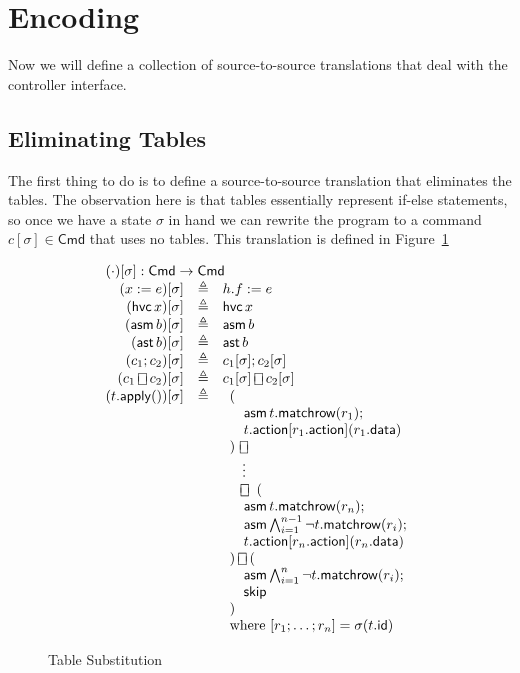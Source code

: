 \documentclass{article}
\newcommand{\Cmd}{\mathsf{Cmd}}
\newcommand{\action}{\mathsf{action}}
\newcommand{\data}{\mathsf{data}}
\newcommand{\id}{\mathsf{id}}
\newcommand{\assert}{\mathop{\mathsf{ast}}}
\newcommand{\assume}{\mathop{\mathsf{asm}}}
\newcommand{\apply}{\mathsf{apply}}
\newcommand{\choiceop}{\rotatebox[origin=c]{90}{$\sqsubset\!\!\!\sqsupset$}}
\newcommand{\choice}{\mathbin{\choiceop}}
\newcommand{\havoc}[1]{\mathop{\mathsf{hvc}}#1}
\newcommand{\SKIP}{\mathsf{skip}}
\newcommand{\matchrow}{\mathsf{matchrow}}
\begin{document}
\section{Encoding}

Now we will define a collection of source-to-source translations that deal with
the controller interface.

\subsection{Eliminating Tables}

The first thing to do is to define a source-to-source translation that
eliminates the tables. The observation here is that tables essentially represent
if-else statements, so once we have a state $\sigma$ in hand we can rewrite the
program to a command $c[\sigma] \in \Cmd$ that uses no tables. This translation
is defined in Figure~\ref{fig:table-elim}

\begin{figure}
  \[\begin{array}{r>{\triangleq}cl}
  \multicolumn{3}{l}{(\cdot)[\sigma] : \Cmd \to \Cmd} \\
  (x := e)[\sigma] && h.f := e \\
  (\havoc x)[\sigma] && \havoc x \\
  (\assume b)[\sigma] && \assume b \\
  (\assert b)[\sigma] && \assert b \\
  (c_1;c_2)[\sigma] && c_1[\sigma];c_2[\sigma] \\
  (c_1 \choice c_2)[\sigma] && c_1[\sigma] \choice c_2[\sigma] \\
  (t.\apply())[\sigma] &&
  \begin{array}[t]{l}
    (\\
    \quad \assume {t.\matchrow(r_1)};\\
    \quad t.\action[r_1.\action](r_1.\data)\\
    )~\choice\\
    \phantom)~\,\vdots\\
    \phantom)\,\choice~(\\
    \quad \assume {t.\matchrow(r_n)};\\
    \quad \assume {\bigwedge_{i=1}^{n-1}{\neg t.\matchrow(r_i)}};\\
    \quad t.\action[r_n.\action](r_n.\data)\\
    )\choice (\\
    \quad \assume {\bigwedge_{i=1}^n \neg t.\matchrow(r_i)};\\
    \quad \SKIP \\
    )\\
    \textrm{where}~[r_1;\ldots;r_n] = \sigma(t.\id)
  \end{array}
  \end{array}
  \]
  \caption{Table Substitution}
  \label{fig:table-elim}
\end{figure}
\end{document}
